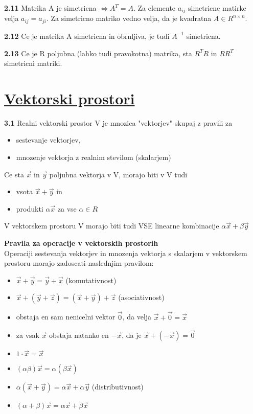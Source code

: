 \documentclass{article}
\begin{document}
\begin{multicols}{2}
	\textbf{2.11} Matrika A je simetricna $\Leftrightarrow A^{T} = A$. Za elemente
	$a_{ij}$ simetricne matirke velja $a_{ij} = a_{ji}$. Za simetricno matriko vedno velja,
	da je kvadratna $A \in R^{n \times n}$.

	\textbf{2.12} Ce je matrika A simetricna in obrnljiva, je tudi $A^{-1}$ simetricna.

	\textbf{2.13} Ce je R poljubna (lahko tudi pravokotna) matrika, sta $R^{T}R$ in
	$RR^{T}$ simetricni matriki.

	\section{\underline{Vektorski prostori}}

	\textbf{3.1} Realni vektorski prostor V je mnozica "vektorjev" skupaj z pravili za
	\begin{itemize}
		\item sestevanje vektorjev,
		\item mnozenje vektorja z realnim stevilom (skalarjem)
	\end{itemize}
	Ce sta $\vec{x}$ in $\vec{y}$ poljubna vektorja v V, morajo biti v V tudi
	\begin{itemize}
		\item vsota $\vec{x} + \vec{y}$ in
		\item produkti $\alpha\vec{x}$ za vse $\alpha \in R$
	\end{itemize}
	V vektorskem prostoru V morajo biti tudi VSE linearne kombinacije
	$\alpha\vec{x} + \beta\vec{y}$

	\textbf{Pravila za operacije v vektorskih prostorih}\\
	Operaciji sestevanja vektorjev in mnozenja vektorja s skalarjem v vektorskem prostoru
	morajo zadoscati naslednjim pravilom:
	\begin{itemize}
		\item $\vec{x} + \vec{y} = \vec{y} + \vec{x}$ (komutativnost)
		\item $\vec{x} + (\vec{y} + \vec{z}) = (\vec{x} + \vec{y}) + \vec{z}$ (asociativnost)
		\item obstaja en sam nenicelni vektor $\vec{0}$, da velja $\vec{x} + \vec{0} = \vec{x}$
		\item za vsak $\vec{x}$ obstaja natanko en $-\vec{x}$, da je $\vec{x} + (-\vec{x}) = \vec{0}$
		\item $1 \cdot \vec{x} = \vec{x}$
		\item $(\alpha\beta)\vec{x} = \alpha(\beta\vec{x})$
		\item $\alpha(\vec{x} + \vec{y}) = \alpha\vec{x} + \alpha\vec{y}$ (distributivnost)
		\item $(\alpha + \beta)\vec{x} = \alpha\vec{x} + \beta\vec{x}$
	\end{itemize}


\end{multicols}
\end{document}
